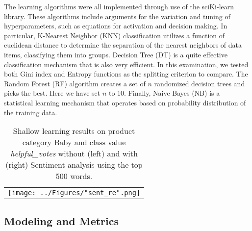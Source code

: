 \documentclass[10pt, conference, compsocconf]{IEEEtran}
\begin{document}
The learning algorithms were all implemented through use of the sciKi-learn \cite{sklearn} library. These algorithms include arguments for the variation and tuning of hyperparameters, such as equations for activation and decision making. In particular, K-Nearest Neighbor (KNN) classification utilizes a function of euclidean distance to determine the separation of the nearest neighbors of data items, classifying them into groups. Decision Tree (DT) is a quite effective classification mechanism that is also very efficient. In this examination, we tested both Gini index and Entropy functions as the splitting criterion to compare. The Random Forest (RF) algorithm creates a set of $n$ randomized decision trees and picks the best. Here we have set $n$ to 10. Finally, Naive Bayes (NB) is a statistical learning mechanism that operates based on probability distribution of the training data. 

\begin{center}
	\begin{table*}[!]
		\centering \footnotesize
		\vspace{0.01cm}
		\caption{Shallow learning results on product category Baby and class value \textit{helpful\_votes} without (left) and with (right) Sentiment analysis using the top 500 words.}
		\hspace{1cm}
		\begin{tabular}{c}
			\texttt{[image: ../Figures/"sent\_re".png]}\\
		\end{tabular}\newline
		\vspace{-0.05cm}
		\label{Table3}
	\end{table*} \hfil
\end{center} \vspace{-6mm}

\subsection{Modeling and Metrics}
\end{document}
